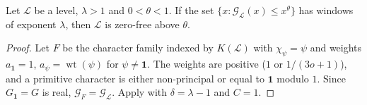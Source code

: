 
\begin{theorem}\label{pn:P018}

\par{}\par
Let $\mathcal L$ be a level, $\lambda>1$ and $0<\theta<1$. If the set
$\{x:\mathcal G_{\mathcal L}(x)\le x^{\theta}\}$ has windows of exponent $\lambda$, then
$\mathcal L$ is zero-free above $\theta$.
\end{theorem}
\begin{proof}
Let $F$ be the character family indexed by $K(\mathcal L)$ with $\chi_\psi=\psi$ and weights
$a_{\mathbf 1}=1$, $a_\psi=\operatorname{wt}(\psi)$ for $\psi\neq\mathbf 1$. The weights are
positive ($1$ or $1/(3o+1)$), and a primitive character is either non-principal or equal to
$\mathbf 1$ modulo $1$. Since $G_{\mathbf 1}=G$ is real, $\mathcal G_F=\mathcal G_{\mathcal L}$.
Apply  with $\delta=\lambda-1$ and $C=1$.

\end{proof}
